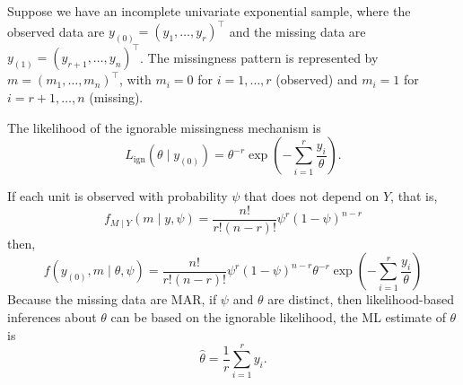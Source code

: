 \begin{example}
	Suppose we have an incomplete univariate exponential sample, where the observed data are \(y_{(0)} = (y_{1}, \ldots, y_{r})^{\top}\) and the missing data are \(y_{(1)} = (y_{r+1}, \ldots, y_{n})^{\top}\). The missingness pattern is represented by \(m = (m_{1}, \ldots, m_{n})^{\top}\), with \(m_{i} = 0\) for \(i = 1, \ldots, r\) (observed) and \(m_{i} = 1\) for \(i = r+1, \ldots, n\) (missing).

	The likelihood of the ignorable missingness mechanism is
	\begin{equation}
		L_{\mathrm{ign}}\left(\theta\mid y_{(0)}\right)=\theta^{-r}\exp\left(-\sum_{i=1}^{r}\frac{y_{i}}{\theta}\right).
	\end{equation}

	If each unit is observed with probability \(\psi\) that does not depend on \(Y\), that is,
	\begin{equation}
		f_{M\mid Y}(m\mid y,\psi)=\frac{n!}{r!(n-r)!}\psi^{r}(1-\psi)^{n-r}
	\end{equation}
	then,
	\begin{equation}
		f\left(y_{(0)},m\mid\theta,\psi\right)=\frac{n!}{r!(n-r)!}\psi^{r}(1-\psi)^{n-r}\theta^{-r}\exp\left(-\sum_{i=1}^{r}\frac{y_{i}}{\theta}\right)
	\end{equation}
	Because the missing data are MAR, if \(\psi\) and \(\theta\) are distinct, then likelihood-based
	inferences about \(\theta\) can be based on the ignorable likelihood, the ML estimate of \(\theta\) is
	\begin{equation}
		\hat{\theta}=\frac{1}{r}\sum_{i=1}^{r}y_{i}.
	\end{equation}


\end{example}
